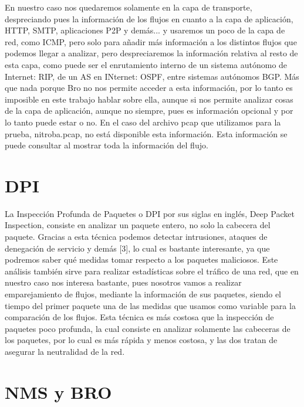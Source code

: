 En nuestro caso nos quedaremos solamente en la capa de transporte, 
despreciando pues la información de los flujos en cuanto a la capa 
de aplicación, HTTP, SMTP, aplicaciones P2P y demás... y usaremos 
un poco de la capa de red, como ICMP, pero solo para añadir más 
información a los distintos flujos que podemos llegar a analizar, 
pero despreciaremos la información relativa al resto de esta capa, 
como puede ser el enrutamiento interno de un sistema autónomo de 
Internet: RIP, de un AS en INternet: OSPF, entre sistemas autónomos 
BGP. Más que nada porque Bro no nos permite acceder a esta información, 
por lo tanto es imposible en este trabajo hablar sobre ella, aunque si 
nos permite analizar cosas de la capa de aplicación, aunque no siempre, 
pues es información opcional y por lo tanto puede estar o no. En el 
caso del archivo pcap que utilizamos para la prueba, nitroba.pcap, 
no está disponible esta información. Esta información se puede consultar 
al mostrar toda la información del flujo.

\section{DPI}

La Inspección Profunda de Paquetes o DPI por sus siglas en inglés, Deep 
Packet Inspection, consiste en analizar un paquete entero, no solo la 
cabecera del paquete. Gracias a esta técnica podemos detectar intrusiones, 
ataques de denegación de servicio y demás [3], lo cual es bastante 
interesante, ya que podremos saber qué medidas tomar respecto a los 
paquetes maliciosos. Este análisis también sirve para realizar estadísticas 
sobre el tráfico de una red, que en nuestro caso nos interesa bastante, 
pues nosotros vamos a realizar emparejamiento de flujos, mediante la 
información de sus paquetes, siendo el tiempo del primer paquete una de las 
medidas que usamos como variable para la comparación de los flujos. Esta 
técnica es más costosa que la inspección de paquetes poco profunda, la 
cual consiste en analizar solamente las cabeceras de los paquetes, por 
lo cual es más rápida y menos costosa, y las dos tratan de asegurar 
la neutralidad de la red.

\section{NMS y BRO}

